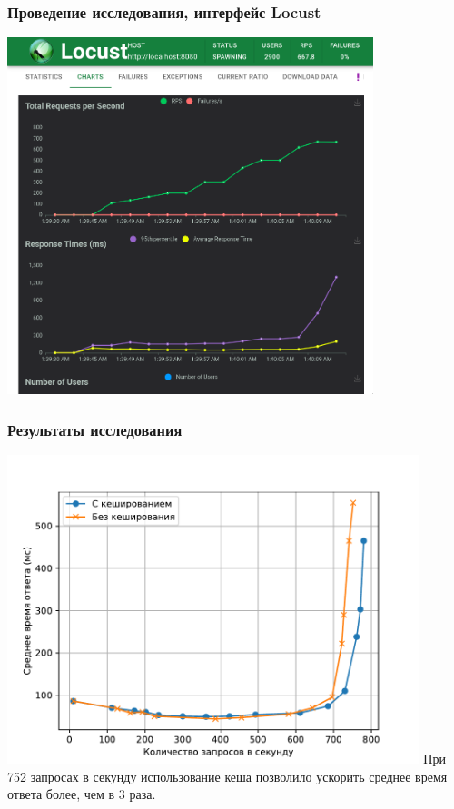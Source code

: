 \documentclass{beamer}
\begin{document}
\begin{frame}
    \frametitle{Проведение исследования, интерфейс Locust}
    \centering
	\includegraphics[width=0.8\textwidth]{img/locust-scr-3.png}
\end{frame}

\begin{frame}
    \frametitle{Результаты исследования}
    \centering
    {
        \includegraphics[width=0.9\textwidth]{img/avg-resp-time.pdf}
    }
    \vfill
    При 752 запросах в секунду использование кеша позволило ускорить среднее время ответа более, чем в 3 раза.
\end{frame}
\end{document}
